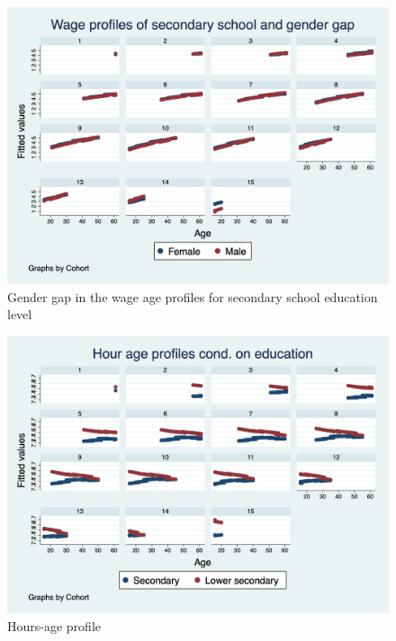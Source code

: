 \documentclass{sistedes}
\begin{document}
\begin{figure}
    \centering
    \includegraphics[scale=0.3]{graph3.png}
    \caption{\label{fig:w_gend_h}Gender gap in the wage age profiles for secondary school education level}
    
\end{figure}
\begin{figure}
    \centering
    \includegraphics[scale=0.3]{graph4.png}
    \caption{\label{fig:hours}Hours-age profile}
    
\end{figure}
\end{document}
